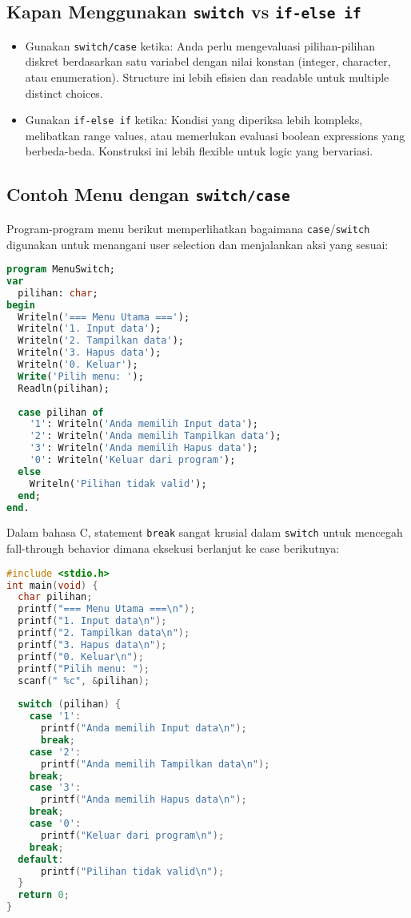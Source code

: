 \documentclass[../main.tex]{subfiles}
\begin{document}
\subsection{Kapan Menggunakan \texttt{switch} vs \texttt{if-else if}}
\begin{itemize}
  \item Gunakan \texttt{switch/case} ketika: Anda perlu mengevaluasi pilihan-pilihan diskret berdasarkan satu variabel dengan nilai konstan (integer, character, atau enumeration). Structure ini lebih efisien dan readable untuk multiple distinct choices.
  \item Gunakan \texttt{if-else if} ketika: Kondisi yang diperiksa lebih kompleks, melibatkan range values, atau memerlukan evaluasi boolean expressions yang berbeda-beda. Konstruksi ini lebih flexible untuk logic yang bervariasi.
\end{itemize}

\subsection{Contoh Menu dengan \texttt{switch/case}}

Program-program menu berikut memperlihatkan bagaimana \texttt{case}/\texttt{switch} digunakan untuk menangani user selection dan menjalankan aksi yang sesuai:

\begin{lstlisting}[language=Pascal, caption={Menu dengan case di Pascal}]
program MenuSwitch;
var
  pilihan: char;
begin
  Writeln('=== Menu Utama ===');
  Writeln('1. Input data');
  Writeln('2. Tampilkan data');
  Writeln('3. Hapus data');
  Writeln('0. Keluar');
  Write('Pilih menu: ');
  Readln(pilihan);
  
  case pilihan of
    '1': Writeln('Anda memilih Input data');
    '2': Writeln('Anda memilih Tampilkan data');
    '3': Writeln('Anda memilih Hapus data');
    '0': Writeln('Keluar dari program');
  else
    Writeln('Pilihan tidak valid');
  end;
end.
\end{lstlisting}

Dalam bahasa C, statement \texttt{break} sangat krusial dalam \texttt{switch} untuk mencegah fall-through behavior dimana eksekusi berlanjut ke case berikutnya:

\begin{lstlisting}[language=C, caption={Menu dengan switch di C}]
#include <stdio.h>
int main(void) {
  char pilihan;
  printf("=== Menu Utama ===\n");
  printf("1. Input data\n");
  printf("2. Tampilkan data\n");
  printf("3. Hapus data\n");
  printf("0. Keluar\n");
  printf("Pilih menu: ");
  scanf(" %c", &pilihan);
  
  switch (pilihan) {
    case '1':
      printf("Anda memilih Input data\n");
      break;
    case '2':
      printf("Anda memilih Tampilkan data\n");
    break;
    case '3':
      printf("Anda memilih Hapus data\n");
    break;
    case '0':
      printf("Keluar dari program\n");
    break;
  default:
      printf("Pilihan tidak valid\n");
  }
  return 0;
}
\end{lstlisting}
\end{document}
